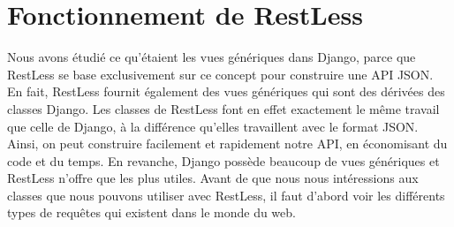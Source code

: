 \documentclass[letterpaper,10pt,oneside]{sphinxmanual}
\begin{document}
\section{Fonctionnement de RestLess}
\label{restless:fonctionnement-de-restless}
Nous avons étudié ce qu'étaient les vues génériques dans Django, parce que RestLess se base exclusivement sur ce concept pour construire une API JSON. En fait, RestLess fournit également des vues génériques qui sont des dérivées des classes Django. Les classes de RestLess font en effet exactement le même travail que celle de Django, à la différence qu'elles travaillent avec le format JSON. Ainsi, on peut construire facilement et rapidement notre API, en économisant du code et du temps. En revanche, Django possède beaucoup de vues génériques et RestLess n'offre que les plus utiles. Avant de que nous nous intéressions aux classes que nous pouvons utiliser avec RestLess, il faut d'abord voir les différents types de requêtes qui existent dans le monde du web.
\end{document}
